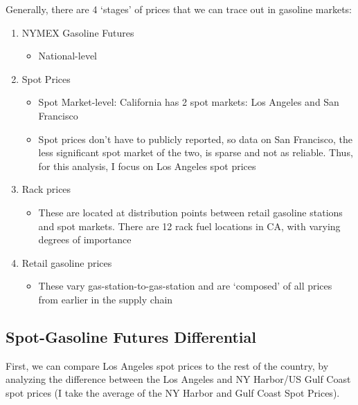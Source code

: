 \documentclass{article}
\begin{document}
Generally, there are 4 `stages' of prices that we can trace out in gasoline markets: 
\begin{enumerate} 
	\item NYMEX Gasoline Futures
	\begin{itemize}
		\item National-level
	\end{itemize}
	\item Spot Prices 
	\begin{itemize}
		\item Spot Market-level: California has 2 spot markets: Los Angeles and San Francisco
		\item Spot prices don't have to publicly reported, so data on San Francisco, the less significant spot market of the two, is sparse and not as reliable. Thus, for this analysis, I focus on Los Angeles spot prices
	\end{itemize}
	\item Rack prices 
	\begin{itemize}
		\item These are located at distribution points between retail gasoline stations and spot markets. There are 12 rack fuel locations in CA, with varying degrees of importance
	\end{itemize}
	\item Retail gasoline prices
	\begin{itemize}
		\item These vary gas-station-to-gas-station and are `composed' of all prices from earlier in the supply chain
	\end{itemize}
\end{enumerate}

\subsection{Spot-Gasoline Futures Differential}
First, we can compare Los Angeles spot prices to the rest of the country, by analyzing the difference between the Los Angeles and NY Harbor/US Gulf Coast spot prices (I take the average of the NY Harbor and Gulf Coast Spot Prices). 
\end{document}
